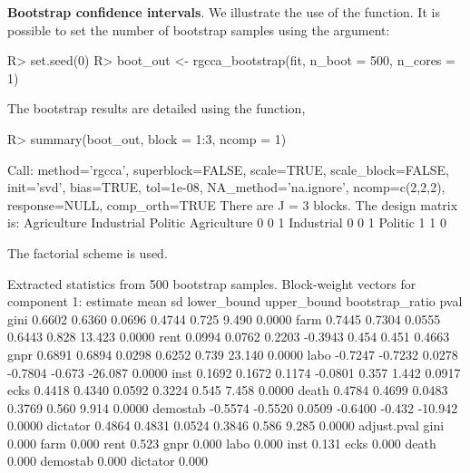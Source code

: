 \documentclass[
]{jss}
\begin{document}
\textbf{Bootstrap confidence intervals}. We illustrate the use of the
 function. It is possible to set the number of
bootstrap samples using the  argument:

\footnotesize

\begin{CodeChunk}
\begin{CodeInput}
R> set.seed(0)
R> boot_out <- rgcca_bootstrap(fit, n_boot = 500, n_cores = 1)
\end{CodeInput}
\end{CodeChunk}

\normalsize

The bootstrap results are detailed using the  function,

\footnotesize

\begin{CodeChunk}
\begin{CodeInput}
R> summary(boot_out, block = 1:3, ncomp = 1)
\end{CodeInput}
\begin{CodeOutput}
Call: method='rgcca', superblock=FALSE, scale=TRUE, scale_block=FALSE, init='svd',
bias=TRUE, tol=1e-08, NA_method='na.ignore', ncomp=c(2,2,2), response=NULL,
comp_orth=TRUE 
There are J = 3 blocks.
The design matrix is:
            Agriculture Industrial Politic
Agriculture           0          0       1
Industrial            0          0       1
Politic               1          1       0

The factorial scheme is used.

Extracted statistics from 500 bootstrap samples.
Block-weight vectors for component 1: 
         estimate    mean     sd lower_bound upper_bound bootstrap_ratio   pval
gini       0.6602  0.6360 0.0696      0.4744       0.725           9.490 0.0000
farm       0.7445  0.7304 0.0555      0.6443       0.828          13.423 0.0000
rent       0.0994  0.0762 0.2203     -0.3943       0.454           0.451 0.4663
gnpr       0.6891  0.6894 0.0298      0.6252       0.739          23.140 0.0000
labo      -0.7247 -0.7232 0.0278     -0.7804      -0.673         -26.087 0.0000
inst       0.1692  0.1672 0.1174     -0.0801       0.357           1.442 0.0917
ecks       0.4418  0.4340 0.0592      0.3224       0.545           7.458 0.0000
death      0.4784  0.4699 0.0483      0.3769       0.560           9.914 0.0000
demostab  -0.5574 -0.5520 0.0509     -0.6400      -0.432         -10.942 0.0000
dictator   0.4864  0.4831 0.0524      0.3846       0.586           9.285 0.0000
         adjust.pval
gini           0.000
farm           0.000
rent           0.523
gnpr           0.000
labo           0.000
inst           0.131
ecks           0.000
death          0.000
demostab       0.000
dictator       0.000
\end{CodeOutput}
\end{CodeChunk}
\end{document}
